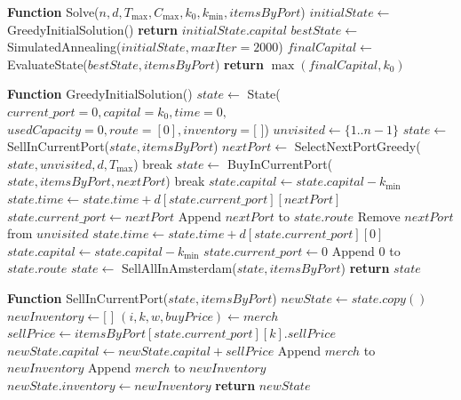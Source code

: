 \documentclass[12pt, a4paper]{article}
\begin{document}
\begin{algorithm}
\caption{Solución Eficiente}\label{alg:ef}
\end{algorithm}
\begin{algorithmic}[1]

\STATE \textbf{Function} Solve($n, d, T_{\max}, C_{\max}, k_0, k_{\min}, itemsByPort$)
\STATE $initialState \gets$ GreedyInitialSolution()
    \STATE \textbf{return} $initialState.capital$
\ENDIF
\STATE $bestState \gets$ SimulatedAnnealing($initialState, maxIter=2000$)
\STATE $finalCapital \gets$ EvaluateState($bestState, itemsByPort$)
\STATE \textbf{return} $\max(finalCapital, k_0)$

\STATE

\STATE \textbf{Function} GreedyInitialSolution()
\STATE $state \gets$ State($current\_port=0, capital=k_0, time=0,$
\STATE \hspace{1cm} $usedCapacity=0, route=[0], inventory=\text{[ ]}$)
\STATE $unvisited \gets \{1..n-1\}$
    \STATE $state \gets$ SellInCurrentPort($state, itemsByPort$)
    \STATE $nextPort \gets$ SelectNextPortGreedy($state, unvisited, d, T_{\max}$)
        \STATE break
    \ENDIF
    \STATE $state \gets$ BuyInCurrentPort($state, itemsByPort, nextPort$)
        \STATE break
    \ENDIF
    \STATE $state.capital \gets state.capital - k_{\min}$
    \STATE $state.time \gets state.time + d[state.current\_port][nextPort]$
    \STATE $state.current\_port \gets nextPort$
    \STATE Append $nextPort$ to $state.route$
    \STATE Remove $nextPort$ from $unvisited$
\ENDWHILE
{}
    \STATE $state.time \gets state.time + d[state.current\_port][0]$
    \STATE $state.capital \gets state.capital - k_{\min}$
    \STATE $state.current\_port \gets 0$
    \STATE Append $0$ to $state.route$
    \STATE $state \gets$ SellAllInAmsterdam($state, itemsByPort$)
\ENDIF
\STATE \textbf{return} $state$

\STATE

\STATE \textbf{Function} SellInCurrentPort($state, itemsByPort$)
\STATE $newState \gets state.copy()$
\STATE $newInventory \gets \text{[ ]}$
    \STATE $(i,k,w,buyPrice) \gets merch$
        \STATE $sellPrice \gets itemsByPort[state.current\_port][k].sellPrice$
            \STATE $newState.capital \gets newState.capital + sellPrice$
        \ELSE
            \STATE Append $merch$ to $newInventory$
        \ENDIF
    \ELSE
        \STATE Append $merch$ to $newInventory$
    \ENDIF
\ENDFOR
\STATE $newState.inventory \gets newInventory$
\STATE \textbf{return} $newState$


\end{algorithmic}
\end{document}
